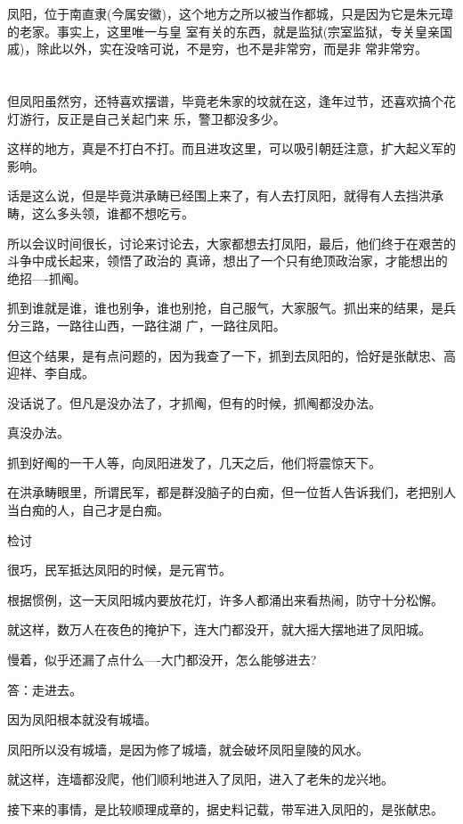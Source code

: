 \documentclass[11pt,a4paper,onecolumn]{article}
\begin{document}
凤阳，位于南直隶(今属安徽)，这个地方之所以被当作都城，只是因为它是朱元璋的老家。事实上，这里唯一与皇
室有关的东西，就是监狱(宗室监狱，专关皇亲国戚)，除此以外，实在没啥可说，不是穷，也不是非常穷，而是非
常非常穷。

\section[\thesection]{}

但凤阳虽然穷，还特喜欢摆谱，毕竟老朱家的坟就在这，逢年过节，还喜欢搞个花灯游行，反正是自己关起门来
乐，警卫都没多少。

这样的地方，真是不打白不打。而且进攻这里，可以吸引朝廷注意，扩大起义军的影响。

话是这么说，但是毕竟洪承畴已经围上来了，有人去打凤阳，就得有人去挡洪承畴，这么多头领，谁都不想吃亏。

所以会议时间很长，讨论来讨论去，大家都想去打凤阳，最后，他们终于在艰苦的斗争中成长起来，领悟了政治的
真谛，想出了一个只有绝顶政治家，才能想出的绝招----抓阄。

抓到谁就是谁，谁也别争，谁也别抢，自己服气，大家服气。抓出来的结果，是兵分三路，一路往山西，一路往湖
广，一路往凤阳。

但这个结果，是有点问题的，因为我查了一下，抓到去凤阳的，恰好是张献忠、高迎祥、李自成。

没话说了。但凡是没办法了，才抓阄，但有的时候，抓阄都没办法。

真没办法。

抓到好阄的一干人等，向凤阳进发了，几天之后，他们将震惊天下。

在洪承畴眼里，所谓民军，都是群没脑子的白痴，但一位哲人告诉我们，老把别人当白痴的人，自己才是白痴。

检讨

很巧，民军抵达凤阳的时候，是元宵节。

根据惯例，这一天凤阳城内要放花灯，许多人都涌出来看热闹，防守十分松懈。

就这样，数万人在夜色的掩护下，连大门都没开，就大摇大摆地进了凤阳城。

慢着，似乎还漏了点什么----大门都没开，怎么能够进去?

答：走进去。

因为凤阳根本就没有城墙。

凤阳所以没有城墙，是因为修了城墙，就会破坏凤阳皇陵的风水。

就这样，连墙都没爬，他们顺利地进入了凤阳，进入了老朱的龙兴地。

接下来的事情，是比较顺理成章的，据史料记载，带军进入凤阳的，是张献忠。
\end{document}
